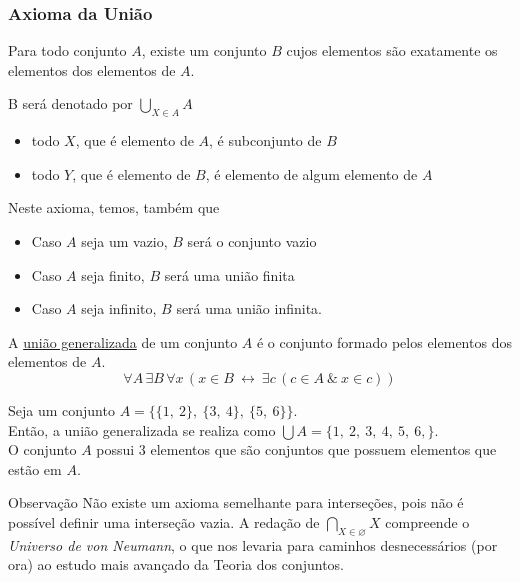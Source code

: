       \subsubsection{Axioma da União}
         \begin{stat}
            Para todo conjunto $A$, existe um conjunto $B$ cujos elementos são exatamente os elementos dos elementos de $A$.
         \end{stat}
            B será denotado por $\bigcup\limits_{X \in A}^{} A$
         \begin{itemize}
            \item todo $X$, que é elemento de $A$, é subconjunto de $B$
            \item todo $Y$, que é elemento de $B$, é elemento de algum elemento de $A$
         \end{itemize}
         Neste axioma, temos, também que
         \begin{itemize}
            \item Caso $A$ seja um vazio, $B$ será o conjunto vazio
            \item Caso $A$ seja finito, $B$ será uma união finita
            \item Caso $A$ seja infinito, $B$ será uma união infinita.
         \end{itemize}
         \begin{definition}
            A \underline{união generalizada} de um conjunto $A$ é o conjunto formado pelos elementos dos elementos de $A$.
            $$\forall A\,\exists B\,\forall x\,(x\in B\ \leftrightarrow\ \exists c\,(c\in A\ \&\ x\in c))$$
         \end{definition}
         \begin{exmp}
            Seja um conjunto $A = \{\{1,\ 2\},\ \{3,\ 4\},\ \{5,\ 6\}\}$.\\
            Então, a união generalizada se realiza como $\bigcup A = \{1,\ 2,\ 3,\ 4,\ 5,\ 6,\}$.\\
            O conjunto $A$ possui 3 elementos que são conjuntos que possuem elementos que estão em $A$.
         \end{exmp}
         \begin{mymdframed}{Observação}
            Não existe um axioma semelhante para interseções, pois não é possível definir uma interseção vazia. A redação de $\bigcap\limits_{X \in \varnothing}^{} X$ compreende o \textit{Universo de von Neumann}, o que nos levaria para caminhos desnecessários (por ora) ao estudo mais avançado da Teoria dos conjuntos.
         \end{mymdframed}

